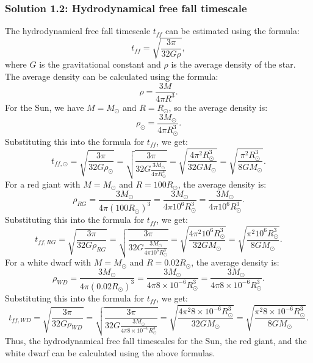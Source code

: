 \subsubsection*{Solution 1.2: Hydrodynamical free fall timescale}
The hydrodynamical free fall timescale $t_{ff}$ can be estimated using the formula:
\begin{equation}
t_{ff} = \sqrt{\frac{3\pi}{32 G \rho}},
\end{equation}
where $G$ is the gravitational constant and $\rho$ is the average density of the star. The average density can be calculated using the formula:
\begin{equation}
\rho = \frac{3M}{4\pi R^3}.
\end{equation}  
For the Sun, we have $M = M_\odot$ and $R = R_\odot$, so the average density is:
\begin{equation}
\rho_\odot = \frac{3M_\odot}{4\pi R_\odot^3}.
\end{equation}
Substituting this into the formula for $t_{ff}$, we get:
\begin{equation}
t_{ff,\odot} = \sqrt{\frac{3\pi}{32 G \rho_\odot}} = \sqrt{\frac{3\pi}{32 G \frac{3M_\odot}{4\pi R_\odot^3}}} = \sqrt{\frac{4\pi^2 R_\odot^3}{32 G M_\odot}} = \sqrt{\frac{\pi^2 R_\odot^3}{8 G M_\odot}}.
\end{equation}
For a red giant with $M = M_\odot$ and $R = 100 R_\odot$, the average density is:
\begin{equation}
\rho_{RG} = \frac{3M_\odot}{4\pi (100 R_\odot)^3} = \frac{3M_\odot}{4\pi 10^6 R_\odot^3} = \frac{3M_\odot}{4\pi 10^6 R_\odot^3}.
\end{equation}
Substituting this into the formula for $t_{ff}$, we get:
\begin{equation}
t_{ff,RG} = \sqrt{\frac{3\pi}{32 G \rho_{RG}}} = \sqrt{\frac{3\pi}{32 G \frac{3M_\odot}{4\pi 10^6 R_\odot^3}}} = \sqrt{\frac{4\pi^2 10^6 R_\odot^3}{32 G M_\odot}} = \sqrt{\frac{\pi^2 10^6 R_\odot^3}{8 G M_\odot}}.
\end{equation}
For a white dwarf with $M = M_\odot$ and $R = 0.02 R_\odot$, the average density is:
\begin{equation}
\rho_{WD} = \frac{3M_\odot}{4\pi (0.02 R_\odot)^3} = \frac{3M_\odot}{4\pi 8 \times 10^{-6} R_\odot^3} = \frac{3M_\odot}{4\pi 8 \times 10^{-6} R_\odot^3}.
\end{equation}
Substituting this into the formula for $t_{ff}$, we get:
\begin{equation}
t_{ff,WD} = \sqrt{\frac{3\pi}{32 G \rho_{WD}}} = \sqrt{\frac{3\pi}{32 G \frac{3M_\odot}{4\pi 8 \times 10^{-6} R_\odot^3}}} = \sqrt{\frac{4\pi^2 8 \times 10^{-6} R_\odot^3}{32 G M_\odot}} = \sqrt{\frac{\pi^2 8 \times 10^{-6} R_\odot^3}{8 G M_\odot}}.
\end{equation}
Thus, the hydrodynamical free fall timescales for the Sun, the red giant, and the white dwarf can be calculated using the above formulas.

